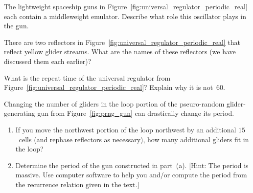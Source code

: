 \begin{multicols}{2}
\begin{problemstar}
\begin{enumerate}[label=\bf\color{ocre}(\alph*)]
			\noindent\begin{center}
			\end{center}
		\end{enumerate}
	\end{problemstar}
	
	
	\mfilbreak
	
	
	\begin{problemstar}\label{exer:p60_regulator_mwss_emulator} 
		The lightweight spaceship guns in Figure~\ref{fig:universal_regulator_periodic_real} each contain a middleweight emulator. Describe what role this oscillator plays in the gun.
	\end{problemstar}
	
	
	\mfilbreak
	
	
	\begin{problem}\label{exer:p60_regulator_reflectors} 
		There are two reflectors in Figure~\ref{fig:universal_regulator_periodic_real} that reflect yellow glider streams. What are the names of these reflectors (we have discussed them each earlier)?
	\end{problem}


	\mfilbreak
	
	
	\begin{problem}\label{exer:universal_regulator_repeat_time} 
		What is the repeat time of the universal regulator from Figure~\ref{fig:universal_regulator_periodic_real}? Explain why it is not~$60$.
	\end{problem}
	
	
	\mfilbreak
	
	
	\begin{problemstar}\label{exer:prng_gun}
		Changing the number of gliders in the loop portion of the pseuro-random glider-generating gun from Figure~\ref{fig:prng_gun} can drastically change its period.\smallskip
		
		\begin{enumerate}[label=\bf\color{ocre}(\alph*)]
			\item {} If you move the northwest portion of the loop northwest by an additional $15$~cells (and rephase reflectors as necessary), how many additional gliders fit in the loop?
			
			\item {} Determine the period of the gun constructed in part~(a). [Hint: The period is massive. Use computer software to help you and/or compute the period from the recurrence relation given in the text.]
			

\end{enumerate}
\end{problemstar}
\end{multicols}
